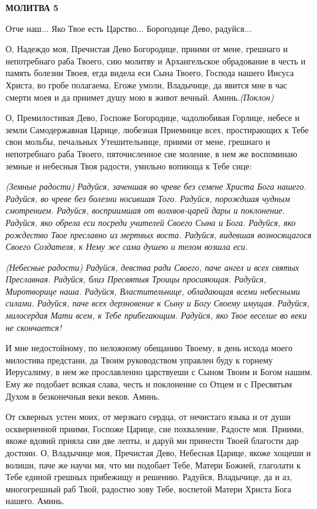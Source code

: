 \medskip


\bfseries МОЛИТВА 5\normalfont{}\nopagebreak


Отче наш... Яко Твое есть Царство... Борогодице Дево, радуйся...

О, Надеждо моя, Пречистая Дево Богородице, приими от мене, грешнаго и непотребнаго раба Твоего, сию молитву и Архангельское обрадование в честь и память болезни Твоея, егда видела еси Сына Твоего, Господа нашего Иисуса Христа, во гробе полагаема, Егоже умоли, Владычице, да явится мне в час смерти моея и да приимет душу мою в живот вечный. Аминь.\itshape  (Поклон)

\normalfont{}О, Премилостивая Дево, Госпоже Богородице, чадолюбивая Горлице, небесе и земли Самодержавная Царице, любезная Приемнице всех, простирающих к Тебе свои мольбы, печальных Утешительнице, приими от мене, грешнаго и непотребнаго раба Твоего, пяточисленное сие моление, в нем же воспоминаю земные и небесныя Твоя радости, умильно вопиюща к Тебе сице: 

\itshape (Земные радости)\normalfont{} Радуйся, заченшая во чреве без семене Христа Бога нашего. Радуйся, во чреве без болезни носившая Того. Радуйся, порождшая чудным смотрением. Радуйся, восприимшая от волхвов-царей дары и поклонение. Радуйся, яко обрела еси посреди учителей Своего Сына и Бога. Радуйся, яко рождество Твое преславно из мертвых воста. Радуйся, видевшая возносящагося Своего Создателя, к Нему же сама душею и телом возшла еси.

\itshape (Небесные радости)\normalfont{} Радуйся, девства ради Своего, паче ангел и всех святых Преславная. Радуйся, близ Пресвятыя Троицы просияющая. Радуйся, Миротворице наша. Радуйся, Властительнице, обладающая всеми небесными силами. Радуйся, паче всех дерзновение к Сыну и Богу Своему имущая. Радуйся, милосердая Мати всем, к Тебе прибегающим. Радуйся, яко Твое веселие во веки не скончается!

И мне недостойному, по неложному обещанию Твоему, в день исхода моего милостива предстани, да Твоим руководством управлен буду к горнему Иерусалиму, в нем же прославленно царствуеши с Сыном Твоим и Богом нашим. Ему же подобает всякая слава, честь и поклонение со Отцем и с Пресвятым Духом в безконечныя веки веков. Аминь.

От скверных устен моих, от мерзкаго сердца, от нечистаго языка и от души оскверненной приими, Госпоже Царице, сие похваление, Радосте моя. Приими, якоже вдовий прияла сии две лепты, и даруй ми принести Твоей благости дар достоин. О, Владычице моя, Пречистая Дево, Небесная Царице, якоже хощеши и волиши, паче же научи мя, что ми подобает Тебе, Матери Божией, глаголати к Тебе единой грешных прибежищу и решению. Радуйся, Владычице, да и аз, многогрешный раб Твой, радостно зову Тебе, воспетой Матери Христа Бога нашего. Аминь.

